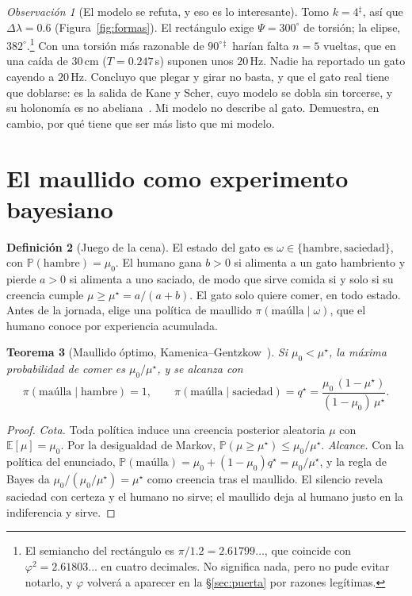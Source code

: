 \documentclass[11pt,a4paper]{article}
\theoremstyle{plain}
\newtheorem{teorema}{Teorema}[section]
\theoremstyle{definition}
\newtheorem{definicion}[teorema]{Definición}
\theoremstyle{remark}
\newtheorem{observacion}[teorema]{Observación}
\numberwithin{equation}{section}
\newcommand{\E}{\mathbb{E}}
\renewcommand{\P}{\mathbb{P}}
\newcommand{\calib}{{\ensuremath{^{\ddagger}}}}
\begin{document}
\begin{observacion}[El modelo se refuta, y eso es lo interesante]
Tomo $k=4$\calib, así que $\Delta\lambda=0.6$ (Figura~\ref{fig:formas}). El rectángulo exige $\Psi=300^\circ$ de torsión; la elipse, $382^\circ$.\footnote{El semiancho del rectángulo es $\pi/1.2=2.61799\ldots$, que coincide con $\varphi^2=2.61803\ldots$ en cuatro decimales. No significa nada, pero no pude evitar notarlo, y $\varphi$ volverá a aparecer en la \S\ref{sec:puerta} por razones legítimas.} Con una torsión más razonable de $90^\circ$\calib\ harían falta $n=5$ vueltas, que en una caída de $30$\,cm ($T=0.247$\,s) suponen unos $20$\,Hz. Nadie ha reportado un gato cayendo a $20$\,Hz. Concluyo que plegar y girar no basta, y que el gato real tiene que doblarse: es la salida de Kane y Scher, cuyo modelo se dobla sin torcerse, y su holonomía es no abeliana~\cite{kanescher,montgomery}. Mi modelo no describe al gato. Demuestra, en cambio, por qué tiene que ser más listo que mi modelo.
\end{observacion}

\section{El maullido como experimento bayesiano}\label{sec:maullido}

\begin{definicion}[Juego de la cena]
El estado del gato es $\omega\in\{\text{hambre},\text{saciedad}\}$, con $\P(\text{hambre})=\mu_0$. El humano gana $b>0$ si alimenta a un gato hambriento y pierde $a>0$ si alimenta a uno saciado, de modo que sirve comida si y solo si su creencia cumple $\mu\ge\mu^\star=a/(a+b)$. El gato solo quiere comer, en todo estado. Antes de la jornada, elige una política de maullido $\pi(\text{maúlla}\mid\omega)$, que el humano conoce por experiencia acumulada.
\end{definicion}

\begin{teorema}[Maullido óptimo, Kamenica--Gentzkow~\cite{kamenica}]\label{teo:maullido}
Si $\mu_0<\mu^\star$, la máxima probabilidad de comer es $\mu_0/\mu^\star$, y se alcanza con
\begin{equation}
  \pi(\text{maúlla}\mid\text{hambre})=1,
  \qquad
  \pi(\text{maúlla}\mid\text{saciedad})=q^\star=\frac{\mu_0\,(1-\mu^\star)}{(1-\mu_0)\,\mu^\star}.
\end{equation}
\end{teorema}

\begin{proof}
\emph{Cota.} Toda política induce una creencia posterior aleatoria $\mu$ con $\E[\mu]=\mu_0$. Por la desigualdad de Markov, $\P(\mu\ge\mu^\star)\le\mu_0/\mu^\star$. \emph{Alcance.} Con la política del enunciado, $\P(\text{maúlla})=\mu_0+(1-\mu_0)q^\star=\mu_0/\mu^\star$, y la regla de Bayes da $\mu_0/(\mu_0/\mu^\star)=\mu^\star$ como creencia tras el maullido. El silencio revela saciedad con certeza y el humano no sirve; el maullido deja al humano justo en la indiferencia y sirve.
\end{proof}
\end{document}
